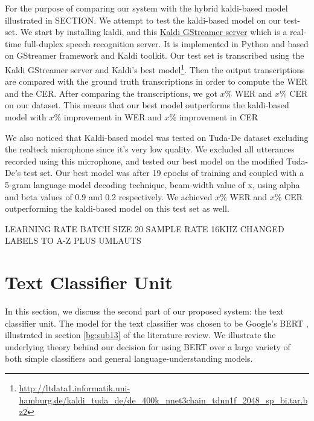 
For the purpose of comparing our system with the hybrid kaldi-based model \cite{milde2018open} illustrated in SECTION. We attempt to test the kaldi-based model on our test-set. We start by installing kaldi, and this \href{https://github.com/alumae/kaldi-gstreamer-server}{Kaldi GStreamer server} which is a real-time full-duplex speech recognition server. It is implemented in Python and based on GStreamer framework and Kaldi toolkit. Our test set is transcribed using the Kaldi GStreamer server and Kaldi's best model\footnote{\url{http://ltdata1.informatik.uni-hamburg.de/kaldi_tuda_de/de_400k_nnet3chain_tdnn1f_2048_sp_bi.tar.bz2}}. Then the output transcriptions are compared with the ground truth transcriptions in order to compute the \ac{WER} and the \ac{CER}. After comparing the transcriptions, we got $x\%$ \ac{WER} and  $x\%$ \ac{CER} on our dataset. This means that our best model outperforms the kaldi-based model with $x\%$ improvement in \ac{WER} and $x\%$ improvement in \ac{CER}

We also noticed that Kaldi-based model was tested on Tuda-De dataset excluding the realteck microphone since it's very low quality. We excluded all utterances recorded using this microphone, and tested our best model on the modified Tuda-De's test set. Our best model was after 19 epochs of training and coupled with a 5-gram language model decoding technique, beam-width value of x, using alpha and beta values of 0.9 and 0.2 respectively. We achieved $x\%$ \ac{WER} and $x\%$ \ac{CER} outperforming the kaldi-based model on this test set as well.

LEARNING RATE
BATCH SIZE 20
SAMPLE RATE 16KHZ
CHANGED LABELS TO A-Z PLUS UMLAUTS

\section{Text Classifier Unit} 
\label{meth:s3}

In this section, we discuss the second part of our proposed system: the text classifier unit. The model for the text classifier was chosen to be Google's \acf{BERT} \cite{devlin2018bert}, illustrated in section \ref{bg:sub13} of the literature review. We illustrate the underlying theory behind our decision for using \ac{BERT} over a large variety of both simple classifiers and general language-understanding models.

